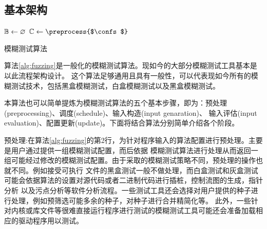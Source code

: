 \documentclass[bachelor]{njupthesis}
\begin{document}
\subsection{基本架构}
\begin{algorithm}[H]
	\KwIn{\confs, \timeout}
	$\mathbb{B} \gets \varnothing$\;
	$\confs \gets \preprocess{$\confs$}$\;
	\Return{\bugs}\;
	\caption[short]{模糊测试算法}\label{alg:fuzzing} 
\end{algorithm} 
\vspace{6pt}

算法\ref{alg:fuzzing}是一般化的模糊测试算法。现如今的大部分模糊测试工具基本是以此流程架构设计。 
这个算法足够通用且具有一般性，可以代表现如今所有的模糊测试技术，包括黑盒模糊测试，白盒模糊测试以及黑盒模糊测试。

本算法也可以简单提炼为模糊测试算法的五个基本步骤，即为：预处理(preprocessing)、调度(schedule)、输入构造(input genaration)、
输入评估(input evaluation)、配置更新(update)。下面将结合算法分别简单介绍各个阶段。

预处理:在算法\ref{alg:fuzzing}的第2行，为针对程序输入的算法配置进行预处理。主要是用户通过提供一组模糊测试配置，而后依据
模糊测试算法进行处理从而返回一组可能经过修改的模糊测试配置。由于采取的模糊测试策略不同，预处理的操作也就不同。例如接受可执行
文件的黑盒测试一般不做处理，而白盒测试和灰盒测试可能会依据算法的设置对源代码或者二进制代码进行插桩，控制流图的生成，指针分析
以及污点分析等软件分析流程。一些测试工具还会选择对用户提供的种子进行处理，例如预筛选可能多余的种子，对种子进行合并精简化等。
此外，一些针对内核或库文件等很难直接运行程序进行测试的模糊测试工具可能还会准备加载相应的驱动程序用以测试。
\end{document}
